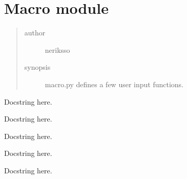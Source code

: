 \documentclass[letterpaper,10pt,english]{sphinxmanual}
\begin{document}
\section{Macro module}
\label{macro:macro-module}\label{macro:module-macro}\label{macro::doc}\begin{quote}\begin{description}
\item[{author}] \leavevmode
neriksso

\item[{synopsis}] \leavevmode
macro.py defines a few user input functions.

\end{description}\end{quote}

\begin{fulllineitems}
\label{macro:macro.GetKeydown}
Docstring here.

\end{fulllineitems}


\begin{fulllineitems}
\label{macro:macro.HardwareInput}
Docstring here.

\end{fulllineitems}


\begin{fulllineitems}
\label{macro:macro.Input}
Docstring here.

\end{fulllineitems}


\begin{fulllineitems}
\label{macro:macro.Input_I}
Docstring here.

\end{fulllineitems}


\begin{fulllineitems}
\label{macro:macro.KeyBdInput}
Docstring here.

\end{fulllineitems}
\end{document}
